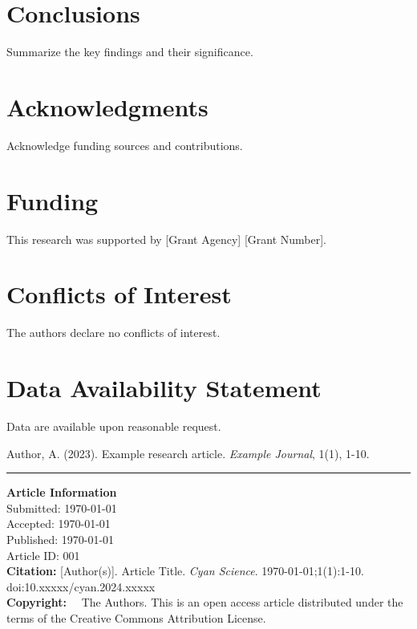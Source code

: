 \documentclass[12pt,twoside]{article}
\makeatletter
\def\@articletitle{Article Title}
\def\@submissiondate{\today}
\def\@acceptancedate{\today}
\def\@publicationdate{\today}
\def\@volume{1}
\def\@issue{1}
\def\@pages{1-10}
\def\@articleid{001}
\def\@articledoi{10.xxxxx/cyan.2024.xxxxx}
\newcommand{\articleinfo}{%
    \vspace{1cm}
    \hrule
    \vspace{0.3cm}
    {\small
    \textbf{Article Information}\\
    Submitted: \@submissiondate\\
    Accepted: \@acceptancedate\\
    Published: \@publicationdate\\
    Article ID: \@articleid\\
    
    \textbf{Citation:} [Author(s)]. \@articletitle. \textit{Cyan Science}. \@publicationdate;\@volume(\@issue):\@pages. doi:\@articledoi\\
    
    \textbf{Copyright:} \textcopyright\ \the\year\ The Authors. This is an open access article distributed under the terms of the Creative Commons Attribution License.
    }
}
\makeatother
\begin{document}
\section{Conclusions}
Summarize the key findings and their significance.

\section*{Acknowledgments}
Acknowledge funding sources and contributions.

\section*{Funding}
This research was supported by [Grant Agency] [Grant Number].

\section*{Conflicts of Interest}
The authors declare no conflicts of interest.

\section*{Data Availability Statement}
Data are available upon reasonable request.

\begin{thebibliography}{99}
Author, A. (2023). Example research article. \textit{Example Journal}, 1(1), 1-10.
\end{thebibliography}

\articleinfo

\end{document}
